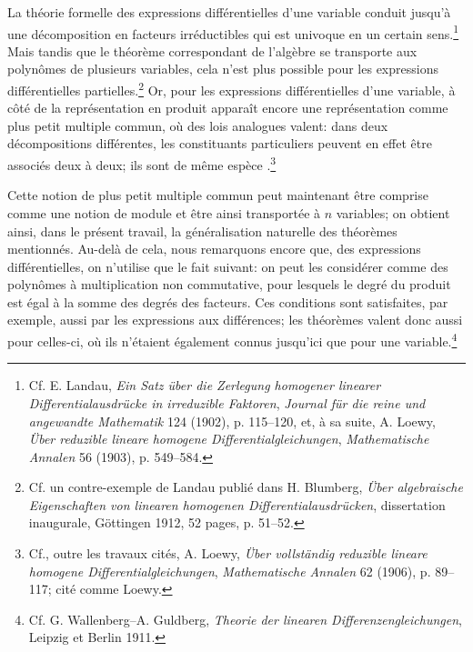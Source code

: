 La théorie formelle des expressions différentielles d'une variable conduit jusqu'à une décomposition en facteurs irréductibles qui est univoque en un certain sens.\footnote{Cf. E. Landau, \emph{Ein Satz über die Zerlegung homogener linearer Differentialausdrücke in irreduzible Faktoren}, \emph{Journal für die reine und angewandte Mathematik} 124 (1902), p. 115--120, et, à sa suite, A. Loewy, \emph{Über reduzible lineare homogene Differentialgleichungen}, \emph{Mathematische Annalen} 56 (1903), p. 549--584.} Mais tandis que le théorème correspondant de l'algèbre se transporte aux polynômes de plusieurs variables, cela n'est plus possible pour les expressions différentielles partielles.\footnote{Cf. un contre-exemple de Landau publié dans H. Blumberg, \emph{Über algebraische Eigenschaften von linearen homogenen Differentialausdrücken}, dissertation inaugurale, Göttingen 1912, 52 pages, p. 51--52.} Or, pour les expressions différentielles d'une variable, à côté de la représentation en produit apparaît encore une représentation comme plus petit multiple commun, où des lois analogues valent: dans deux décompositions différentes, les constituants particuliers peuvent en effet être associés deux à deux; ils sont \og{} de même espèce \fg{}.\footnote{Cf., outre les travaux cités, A. Loewy, \emph{Über vollständig reduzible lineare homogene Differentialgleichungen}, \emph{Mathematische Annalen} 62 (1906), p. 89--117; cité comme Loewy.}

Cette notion de plus petit multiple commun peut maintenant être comprise comme une notion de module et être ainsi transportée à $n$ variables; on obtient ainsi, dans le présent travail, la généralisation naturelle des théorèmes mentionnés. Au-delà de cela, nous remarquons encore que, des expressions différentielles, on n'utilise que le fait suivant: on peut les considérer comme des polynômes à multiplication non commutative, pour lesquels le degré du produit est égal à la somme des degrés des facteurs. Ces conditions sont satisfaites, par exemple, aussi par les expressions aux différences; les théorèmes valent donc aussi pour celles-ci, où ils n'étaient également connus jusqu'ici que pour une variable.\footnote{Cf. G. Wallenberg--A. Guldberg, \emph{Theorie der linearen Differenzengleichungen}, Leipzig et Berlin 1911.}


